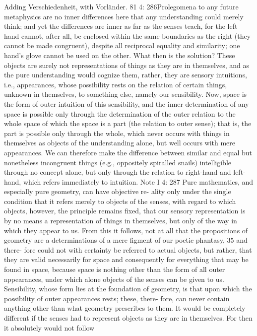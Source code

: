 Adding Verschiedenheit, with Vorländer.
81
4: 286Prolegomena to any future metaphysics
are no inner differences here that any understanding could merely think;
and yet the differences are inner as far as the senses teach, for the left hand
cannot, after all, be enclosed within the same boundaries as the right (they
cannot be made congruent), despite all reciprocal equality and similarity;
one hand’s glove cannot be used on the other. What then is the solution?
These objects are surely not representations of things as they are in
themselves, and as the pure understanding would cognize them, rather,
they are sensory intuitions, i.e., appearances, whose possibility rests on
the relation of certain things, unknown in themselves, to something
else, namely our sensibility. Now, space is the form of outer intuition
of this sensibility, and the inner determination of any space is possible
only through the determination of the outer relation to the whole space
of which the space is a part (the relation to outer sense); that is, the
part is possible only through the whole, which never occurs with things
in themselves as objects of the understanding alone, but well occurs
with mere appearances. We can therefore make the difference between
similar and equal but nonetheless incongruent things (e.g., oppositely
spiralled snails) intelligible through no concept alone, but only through
the relation to right-hand and left-hand, which refers immediately to
intuition.
Note I
4: 287
Pure mathematics, and especially pure geometry, can have objective re-
ality only under the single condition that it refers merely to objects of
the senses, with regard to which objects, however, the principle remains
ﬁxed, that our sensory representation is by no means a representation
of things in themselves, but only of the way in which they appear to us.
From this it follows, not at all that the propositions of geometry are a
determinations of a mere ﬁgment of our poetic phantasy, 35 and there-
fore could not with certainty be referred to actual objects, but rather,
that they are valid necessarily for space and consequently for everything
that may be found in space, because space is nothing other than the form
of all outer appearances, under which alone objects of the senses can be
given to us. Sensibility, whose form lies at the foundation of geometry, is
that upon which the possibility of outer appearances rests; these, there-
fore, can never contain anything other than what geometry prescribes
to them. It would be completely different if the senses had to represent
objects as they are in themselves. For then it absolutely would not follow
